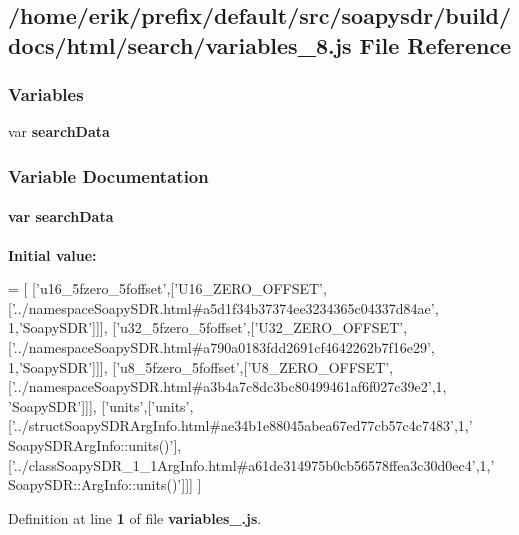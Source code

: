 \subsection{/home/erik/prefix/default/src/soapysdr/build/docs/html/search/variables\+\_\+8.js File Reference}
\label{variables__8_8js}
\subsubsection*{Variables}
\begin{DoxyCompactItemize}
\item 
var {\bf search\+Data}
\end{DoxyCompactItemize}


\subsubsection{Variable Documentation}
\paragraph[{search\+Data}]{\setlength{\rightskip}{0pt plus 5cm}var search\+Data}\label{variables__8_8js_ad01a7523f103d6242ef9b0451861231e}
{\bfseries Initial value\+:}
\begin{DoxyCode}
=
[
  [\textcolor{stringliteral}{'u16\_5fzero\_5foffset'},[\textcolor{stringliteral}{'U16\_ZERO\_OFFSET'},[\textcolor{stringliteral}{'../namespaceSoapySDR.html#a5d1f34b37374ee3234365c04337d84ae'},
      1,\textcolor{stringliteral}{'SoapySDR'}]]],
  [\textcolor{stringliteral}{'u32\_5fzero\_5foffset'},[\textcolor{stringliteral}{'U32\_ZERO\_OFFSET'},[\textcolor{stringliteral}{'../namespaceSoapySDR.html#a790a0183fdd2691cf4642262b7f16e29'},
      1,\textcolor{stringliteral}{'SoapySDR'}]]],
  [\textcolor{stringliteral}{'u8\_5fzero\_5foffset'},[\textcolor{stringliteral}{'U8\_ZERO\_OFFSET'},[\textcolor{stringliteral}{'../namespaceSoapySDR.html#a3b4a7c8dc3bc80499461af6f027c39e2'},1,\textcolor{stringliteral}{
      'SoapySDR'}]]],
  [\textcolor{stringliteral}{'units'},[\textcolor{stringliteral}{'units'},[\textcolor{stringliteral}{'../structSoapySDRArgInfo.html#ae34b1e88045abea67ed77cb57c4c7483'},1,\textcolor{stringliteral}{'
      SoapySDRArgInfo::units()'}],[\textcolor{stringliteral}{'../classSoapySDR\_1\_1ArgInfo.html#a61de314975b0cb56578ffea3c30d0ec4'},1,\textcolor{stringliteral}{'
      SoapySDR::ArgInfo::units()'}]]]
]
\end{DoxyCode}


Definition at line {\bf 1} of file {\bf variables\+\_.\+js}.


